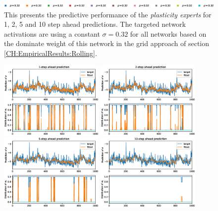 \begin{figure}[H]
\begin{center}
        \includegraphics[width=1.0\textwidth]{Plots/Prediction/legend_Constant_Middle.eps}
    \end{center}
    \caption{This presents the predictive performance of the \textit{plasticity experts} for 1, 2, 5 and 10 step ahead predictions. The targeted network activations are using a constant $\sigma = 0.32$ for all networks based on the dominate weight of this network in the grid approach of section \ref{CH:EmpiricalResults:Rolling}.}
    \label{FIG:PlasticityConstantMiddle}
\end{figure}

\begin{figure}[H]
    \begin{center}
        \includegraphics[width=0.45\textwidth]{Plots/Prediction/Plasticity_Grid_Middle_rolling_1step.eps}
        \includegraphics[width=0.45\textwidth]{Plots/Prediction/Plasticity_Grid_Middle_rolling_2step.eps} \\
        \includegraphics[width=0.45\textwidth]{Plots/Prediction/Plasticity_Grid_Middle_rolling_5step.eps}
        \includegraphics[width=0.45\textwidth]{Plots/Prediction/Plasticity_Grid_Middle_rolling_10step.eps} \\

\end{center}
\end{figure}
